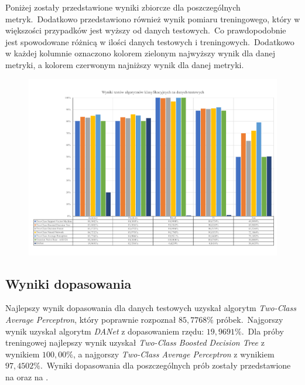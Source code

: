 Poniżej zostały przedstawione wyniki zbiorcze dla poszczególnych metryk.\ Dodatkowo przedstawiono również wynik pomiaru treningowego, który w większości przypadków jest wyższy od danych testowych.\ Co prawdopodobnie jest spowodowane różnicą w ilości danych testowych i treningowych.\ Dodatkowo w każdej kolumnie oznaczono kolorem zielonym najwyższy wynik dla danej metryki, a kolorem czerwonym najniższy wynik dla danej metryki.

\begin{landscape}
    \vspace*{\fill}
    \begin{figure}[H]
        \centering
        \includegraphics[height=0.8\textwidth]{images/predict_result}
        \label{fig:predict-result}
    \end{figure}
    \vfill
\end{landscape}

\subsection{Wyniki dopasowania}
Najlepszy wynik dopasowania dla danych testowych uzyskał algorytm \textit{Two-Class Average Perceptron}, który poprawnie rozpoznał $85,7768\%$ próbek.\ Najgorszy wynik uzyskał algorytm \textit{DANet} z dopasowaniem rzędu: $19,9691\%$.\ Dla próby treningowej najlepszy wynik uzyskał \textit{Two-Class Boosted Decision Tree} z wynikiem $100,00\%$, a najgorszy \textit{Two-Class Average Perceptron} z wynikiem $97,4502\%$.\ Wyniki dopasowania dla poszczególnych prób zostały przedstawione na  oraz na .


